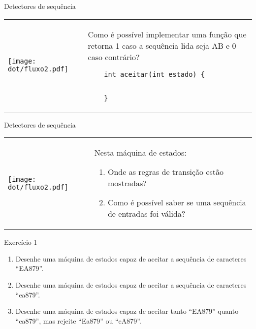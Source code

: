 \documentclass{beamer}
\begin{document}
\begin{frame}[fragile]{Detectores de sequência}
  \centering
  \large
  \begin{tabular}{l m{8cm}}
    \begin{minipage}{.3\textwidth}
   \texttt{[image: dot/fluxo2.pdf]}
    \end{minipage}
  &
    Como é possível implementar uma função que retorna 1 caso a sequência lida
    seja AB e 0 caso contrário?
    \begin{verbatim}
    int aceitar(int estado) {


    }

    \end{verbatim}
    \\
  \end{tabular}
\end{frame}



\begin{frame}[fragile]{Detectores de sequência}
  \centering
  \large
  \begin{tabular}{l m{8cm}}
    \begin{minipage}{.3\textwidth}
   \texttt{[image: dot/fluxo2.pdf]}
    \end{minipage}
  &
    Nesta máquina de estados:
    \begin{enumerate}
    \item Onde as regras de transição estão mostradas?
    \item Como é possível saber se uma sequência de entradas foi válida?
    \end{enumerate}
    \\
  \end{tabular}
\end{frame}

\begin{frame}[fragile]{Exercício 1}
  \centering
  \large
  \begin{enumerate}
    \item Desenhe uma máquina de estados capaz de aceitar a sequência de caracteres ``EA879''.
    \item Desenhe uma máquina de estados capaz de aceitar a sequência de
      caracteres ``ea879''.
    \item Desenhe uma máquina de estados capaz de aceitar tanto ``EA879''
      quanto ``ea879'', mas rejeite ``Ea879'' ou ``eA879''.
  \end{enumerate}
\end{frame}
\end{document}
